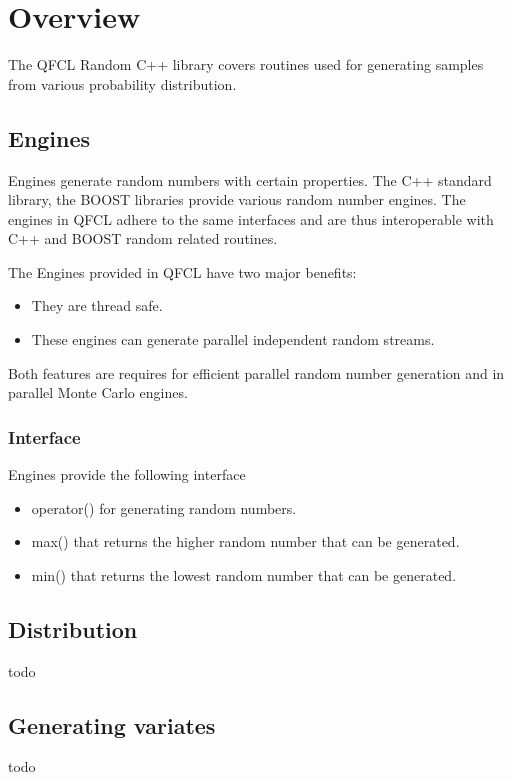 \newpage
\chapter{Overview}
The QFCL Random C++ library covers routines used for generating samples from various probability distribution.


\section{Engines}
Engines generate random numbers with certain properties. The C++ standard library, the BOOST libraries provide various random
number engines. The engines in QFCL adhere to the same interfaces and are thus interoperable with C++ and BOOST random related routines. 

The Engines provided in QFCL have two major benefits:
\begin{itemize}
\item They are thread safe.
\item These engines can generate parallel independent random streams.
\end{itemize}
Both features are requires for efficient parallel random number generation and in parallel Monte Carlo engines.

\subsection{Interface}
Engines provide the following interface
\begin{itemize}
\item operator() for generating random numbers.
\item max() that returns the higher random number that can be generated.
\item min() that returns the lowest random number that can be generated.
\end{itemize}

\section{Distribution}
todo


\section{Generating variates}
todo

